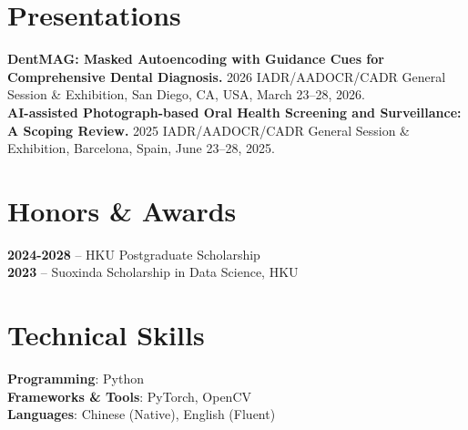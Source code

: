 \documentclass[letterpaper,10pt]{article}
\begin{document}
\section{Presentations}
  \begin{itemize}[leftmargin=0.15in, label={}]
    \small{\item{
      \textbf{DentMAG: Masked Autoencoding with Guidance Cues for Comprehensive Dental Diagnosis.} 2026 IADR/AADOCR/CADR General Session \& Exhibition, San Diego, CA, USA, March 23--28, 2026. \\
      \textbf{AI-assisted Photograph-based Oral Health Screening and Surveillance: A Scoping Review.} 2025 IADR/AADOCR/CADR General Session \& Exhibition, Barcelona, Spain, June 23--28, 2025.
    }}
  \end{itemize}


\section{Honors \& Awards}
 \begin{itemize}[leftmargin=0.15in, label={}]
    \small{\item{
      \textbf{2024-2028} -- HKU Postgraduate Scholarship \\
     \textbf{2023} -- Suoxinda Scholarship in Data Science, HKU\\
    }}
 \end{itemize}


\section{Technical Skills}
 \begin{itemize}[leftmargin=0.15in, label={}]
    \small{\item{
     \textbf{Programming}{: Python} \\
     \textbf{Frameworks \& Tools}{: PyTorch, OpenCV} \\
     \textbf{Languages}{: Chinese (Native), English (Fluent)}
    }}
 \end{itemize}


\end{document}
